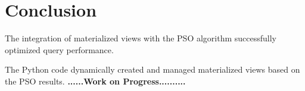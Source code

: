 \section{Conclusion}
The integration of materialized views with the PSO algorithm successfully optimized query performance.

The Python code dynamically created and managed materialized views based on the PSO results.
\textbf{......\textbf{Work on Progress}..........}       